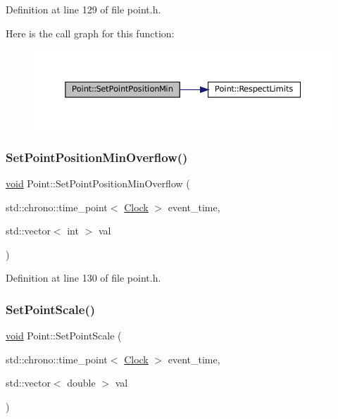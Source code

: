 Definition at line 129 of file point.\+h.

Here is the call graph for this function\+:\nopagebreak
\begin{figure}[H]
\begin{center}
\leavevmode
\includegraphics[width=350pt]{class_point_ad47980a6ed515a2def172d757af46f1a_cgraph}
\end{center}
\end{figure}
\mbox{\label{class_point_ab0c0a837abb8bd52a59f82723a31f61f}} 
\subsubsection{\texorpdfstring{Set\+Point\+Position\+Min\+Overflow()}{SetPointPositionMinOverflow()}}
{\footnotesize\ttfamily \mbox{\hyperlink{glad_8h_a950fc91edb4504f62f1c577bf4727c29}{void}} Point\+::\+Set\+Point\+Position\+Min\+Overflow (\begin{DoxyParamCaption}\item[{std\+::chrono\+::time\+\_\+point$<$ \mbox{\hyperlink{universe_8h_a0ef8d951d1ca5ab3cfaf7ab4c7a6fd80}{Clock}} $>$}]{event\+\_\+time,  }\item[{std\+::vector$<$ int $>$}]{val }\end{DoxyParamCaption})\hspace{0.3cm}{\ttfamily [inline]}}



Definition at line 130 of file point.\+h.

\mbox{\label{class_point_a8fc02455a773624df80933403b0e545f}} 
\subsubsection{\texorpdfstring{Set\+Point\+Scale()}{SetPointScale()}}
{\footnotesize\ttfamily \mbox{\hyperlink{glad_8h_a950fc91edb4504f62f1c577bf4727c29}{void}} Point\+::\+Set\+Point\+Scale (\begin{DoxyParamCaption}\item[{std\+::chrono\+::time\+\_\+point$<$ \mbox{\hyperlink{universe_8h_a0ef8d951d1ca5ab3cfaf7ab4c7a6fd80}{Clock}} $>$}]{event\+\_\+time,  }\item[{std\+::vector$<$ double $>$}]{val }\end{DoxyParamCaption})\hspace{0.3cm}{\ttfamily [inline]}}



